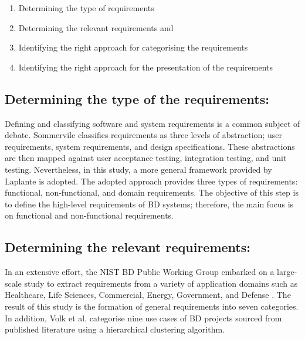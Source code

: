\documentclass[review]{elsarticle}
\begin{document}
\begin{enumerate}

    \item Determining the type of requirements 

    \item Determining the relevant requirements and 

    \item Identifying the right approach for categorising the requirements 

    \item Identifying the right approach for the presentation of the requirements 

\end{enumerate}

\subsection{Determining the type of the requirements:}

Defining and classifying software and system requirements is a common subject of debate. Sommervile \cite{sommerville2011software} classifies requirements as three levels of abstraction; user requirements, system requirements, and design specifications. These abstractions are then mapped against user acceptance testing, integration testing, and unit testing. Nevertheless, in this study, a more general framework provided by Laplante \cite{laplante2017requirements} is adopted. The adopted approach provides three types of requirements: functional, non-functional, and domain requirements. The objective of this step is to define the high-level requirements of BD systems; therefore, the main focus is on functional and non-functional requirements. 

\subsection{Determining the relevant requirements:}

In an extensive effort, the NIST BD Public Working Group embarked on a large-scale study to extract requirements from a variety of application domains such as Healthcare, Life Sciences, Commercial, Energy, Government, and Defense \cite{Chang}. The result of this study is the formation of general requirements into seven categories. In addition, Volk et al. \cite{volk2020identifying} categorise nine use cases of BD projects sourced from published literature using a hierarchical clustering algorithm. 
\end{document}

